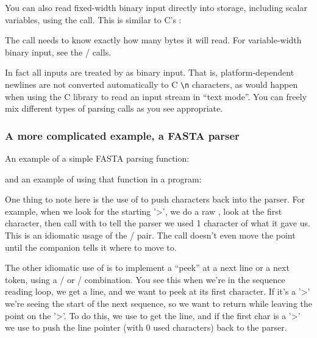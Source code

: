 You can also read fixed-width binary input directly into storage,
including scalar variables, using the 
call. This is similar to C's :



The  call needs to know exactly how many bytes 
it will read. For variable-width binary input, see the
/ calls.

In fact all inputs are treated by  as binary
input. That is, platform-dependent newlines are not converted
automatically to C \verb+\n+ characters, as would happen when using
the C  library to read an input stream in ``text
mode''. You can freely mix different types of 
parsing calls as you see appropriate.


\subsubsection{A more complicated example, a FASTA parser}

An example of a simple FASTA parsing function:



and an example of using that function in a program:



One thing to note here is the use of  to
push characters back into the parser. For example, when we look for
the starting '>', we do a raw , look at the
first character, then call  with
 to tell the parser we used 1 character of what it gave
us. This is an idiomatic usage of the
/ pair.  The
 call doesn't even move the point until the
companion  tells it where to move to.

The other idiomatic use of  is to implement
a ``peek'' at a next line or a next token, using a
/ or
/
combination. You see this when we're in the sequence reading loop, we
get a line, and we want to peek at its first character. If it's a '>'
we're seeing the start of the next sequence, so we want to return
while leaving the point on the '>'. To do this, we use
 to get the line, and if the first char
is a '>' we use  to push the line pointer
(with 0 used characters) back to the parser.

